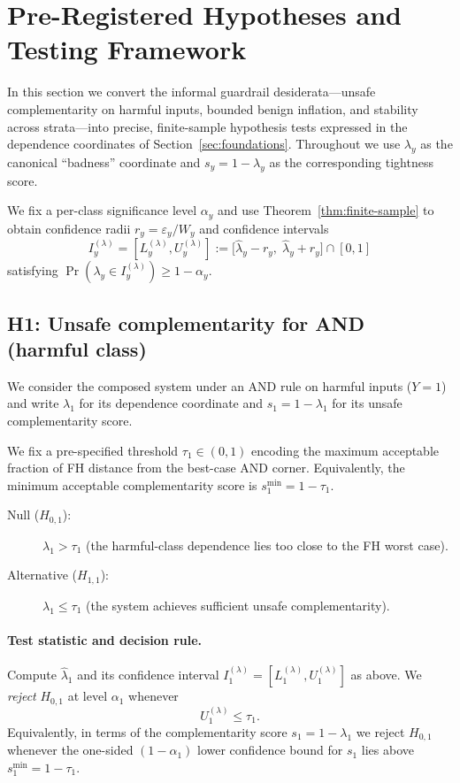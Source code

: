 \section{Pre-Registered Hypotheses and Testing Framework}
\label{sec:prereg}

In this section we convert the informal guardrail desiderata---unsafe
complementarity on harmful inputs, bounded benign inflation, and
stability across strata---into precise, finite-sample hypothesis tests
expressed in the dependence coordinates of
Section~\ref{sec:foundations}.
Throughout we use $\lambda_y$ as the canonical ``badness'' coordinate
and $s_y = 1-\lambda_y$ as the corresponding tightness score.

We fix a per-class significance level $\alpha_y$ and use
Theorem~\ref{thm:finite-sample} to obtain confidence radii
$r_y = \varepsilon_y / W_y$ and confidence intervals
\[
  I_y^{(\lambda)} =
  [L_y^{(\lambda)}, U_y^{(\lambda)}]
  := \bigl[\hat\lambda_y - r_y,\; \hat\lambda_y + r_y\bigr] \cap [0,1]
\]
satisfying
$\Pr(\lambda_y \in I_y^{(\lambda)}) \ge 1-\alpha_y$.

\subsection{H1: Unsafe complementarity for AND (harmful class)}

We consider the composed system under an AND rule on harmful inputs
($Y=1$) and write $\lambda_1$ for its dependence coordinate and
$s_1 = 1-\lambda_1$ for its unsafe complementarity score.

We fix a pre-specified threshold $\tau_1 \in (0,1)$ encoding the
maximum acceptable fraction of FH distance from the best-case AND
corner.
Equivalently, the minimum acceptable complementarity score is
$s_1^{\min} = 1-\tau_1$.

\begin{hypothesis}
\label{hyp:H1}
\mbox{}
\begin{description}
  \item[Null ($H_{0,1}$):]
    $\lambda_1 > \tau_1$ \quad
    (the harmful-class dependence lies too close to the FH worst case).
  \item[Alternative ($H_{1,1}$):]
    $\lambda_1 \le \tau_1$ \quad
    (the system achieves sufficient unsafe complementarity).
\end{description}
\end{hypothesis}

\paragraph{Test statistic and decision rule.}
Compute $\hat\lambda_1$ and its confidence interval
$I_1^{(\lambda)} = [L_1^{(\lambda)}, U_1^{(\lambda)}]$ as above.
We \emph{reject} $H_{0,1}$ at level $\alpha_1$ whenever
\begin{equation}
  U_1^{(\lambda)} \le \tau_1.
  \label{eq:H1-decision}
\end{equation}
Equivalently, in terms of the complementarity score
$s_1 = 1-\lambda_1$ we reject $H_{0,1}$ whenever the one-sided
$(1-\alpha_1)$ lower confidence bound for $s_1$ lies above
$s_1^{\min} = 1-\tau_1$.

